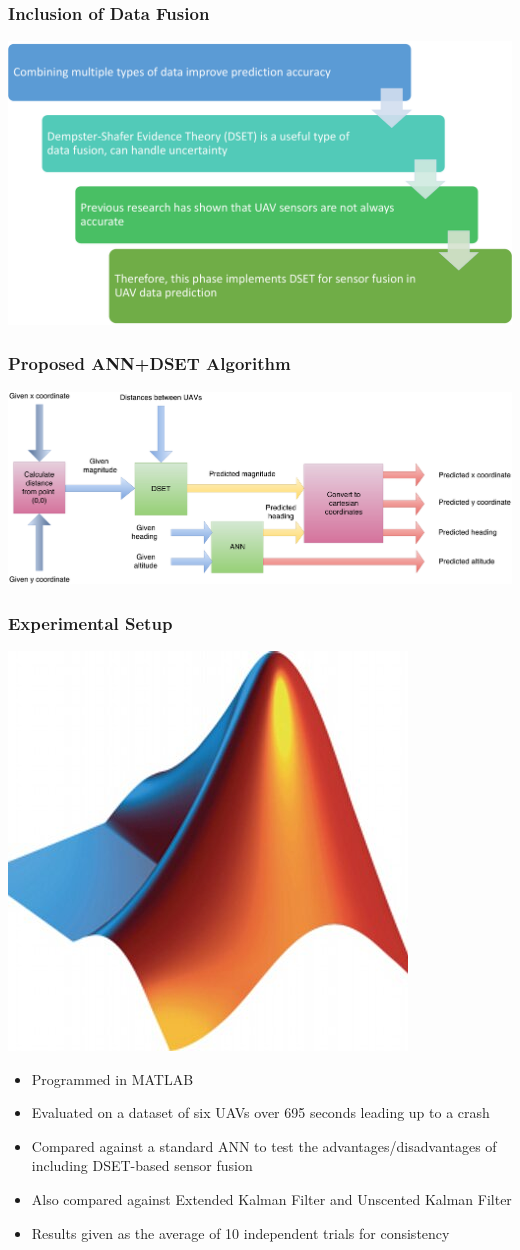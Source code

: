 \documentclass{beamer}
\begin{document}
\begin{frame}
\frametitle{Inclusion of Data Fusion}
\includegraphics[width=\textwidth]{data-fusion}
\end{frame}

\begin{frame}
\frametitle{Proposed ANN+DSET Algorithm}
\includegraphics[width=\textwidth]{dset}
\end{frame}

\begin{frame}
\frametitle{Experimental Setup}
\begin{center}
\includegraphics[width=.2\textwidth]{ml}
\end{center}
\begin{itemize}
\item Programmed in MATLAB
\item Evaluated on a dataset of six UAVs over 695 seconds leading up to a crash
\item Compared against a standard ANN to test the advantages/disadvantages of including DSET-based sensor fusion
\item Also compared against Extended Kalman Filter and Unscented Kalman Filter
\item Results given as the average of 10 independent trials for consistency
\end{itemize}
\end{frame}
\end{document}
